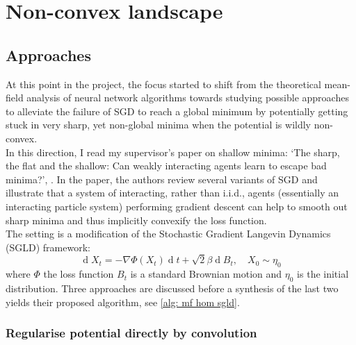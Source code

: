 \documentclass{article}
\theoremstyle{mystyle}
\newcommand{\diff}{\ensuremath{\operatorname{d}\!}}
\begin{document}
\section{Non-convex landscape}

\subsection{Approaches}

At this point in the project, the focus started to shift from the theoretical mean-field analysis of neural network algorithms towards studying possible approaches to alleviate the failure of SGD to reach a global minimum by potentially getting stuck in very sharp, yet non-global minima when the potential is wildly non-convex.\\ 

In this direction, I read my supervisor's paper on shallow minima: ‘The sharp, the flat and the shallow: Can weakly interacting agents learn to escape bad minima?’, \cite{kantas2019sharpflatshallowweakly}. In the paper, the authors review several variants of SGD and illustrate that a system of interacting, rather than i.i.d., agents (essentially an interacting particle system) performing gradient descent can help to smooth out sharp minima and thus implicitly convexify
the loss function.\\ 

The setting is a modification of the Stochastic Gradient Langevin Dynamics (SGLD) framework:
\begin{equation}\label{eq: SGLD}
	\diff X_{t} = -\nabla \Phi(X_{t})\diff t + \sqrt{2}\beta \diff  B_{t}, \quad X_{0}\sim \eta_{0}
\end{equation}
where $ \Phi$ the loss function $ B_{t}$ is a standard Brownian motion and $ \eta_{0}$ is the initial distribution. Three approaches are discussed before a synthesis of the last two yields their proposed algorithm, see \ref{alg: mf hom sgld}.



\subsubsection{Regularise potential directly by convolution}\label{sec:direct smoothing}
\end{document}
